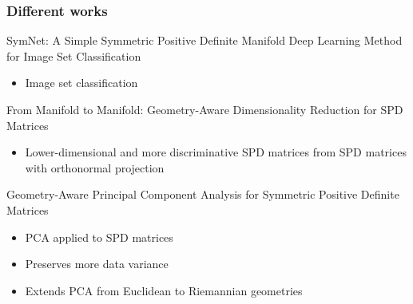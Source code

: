 \documentclass{beamer}
\begin{document}
\begin{frame}
    \frametitle{Different works}
    SymNet: A Simple Symmetric Positive Definite Manifold Deep Learning Method for Image Set Classification \cite{9390301}
    \begin{itemize}
        \item Image set classification
    \end{itemize}
    From Manifold to Manifold: Geometry-Aware Dimensionality Reduction for SPD Matrices \cite{harandi2014manifoldmanifoldgeometryawaredimensionality}
    \begin{itemize}
        \item Lower-dimensional and more discriminative SPD matrices from SPD matrices with orthonormal projection
    \end{itemize}
    Geometry-Aware Principal Component Analysis for Symmetric Positive Definite Matrices \cite{articlepcaaspd}
    \begin{itemize}
        \item PCA applied to SPD matrices
        \item Preserves more data variance
        \item Extends PCA from Euclidean to Riemannian geometries
    \end{itemize}
\end{frame}
\end{document}
